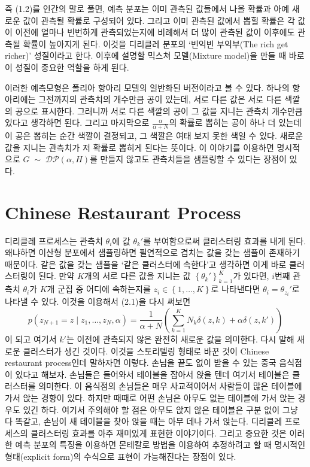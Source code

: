 \documentclass[a4paper, 10pt]{book}
\begin{document}
  즉 (1.2)를 인간의 말로 풀면, 예측 분포는 이미 관측된 값들에서 나올 확률과 아예 새로운 값이 관측될 확률로 구성되어 있다. 그리고 이미 관측된 값에서 뽑힐 확률은 각 값이 이전에 얼마나 빈번하게 관측되었는지에 비례해서 더 많이 관측된 값이 이후에도 관측될 확률이 높아지게 된다. 이것을 디리클레 분포의 `빈익빈 부익부(The rich get richer)' 성질이라고 한다. 이후에 설명할 믹스쳐 모델(Mixture model)을 만들 때 바로 이 성질이 중요한 역할을 하게 된다. \par
  이러한 예측모형은 폴리아 항아리 모델의 일반화된 버전이라고 볼 수 있다. 하나의 항아리에는 그전까지의 관측치의 개수만큼 공이 있는데, 서로 다른 값은 서로 다른 색깔의 공으로 표시한다. 그러니까 서로 다른 색깔의 공이 그 값을 지니는 관측치 개수만큼 있다고 생각하면 된다. 그리고 마지막으로 $\frac{\alpha}{\alpha+N}$의 확률로 뽑히는 공이 하나 더 있는데 이 공은 뽑히는 순간 색깔이 결정되고, 그 색깔은 여태 보지 못한 색일 수 있다. 새로운 값을 지니는 관측치가 저 확률로 뽑히게 된다는 뜻이다. 이 이야기를 이용하면 명시적으로 $G\;\sim\;\mathcal{DP}\left(\alpha, H\right)$를 만들지 않고도 관측치들을 샘플링할 수 있다는 장점이 있다.
  \section{Chinese Restaurant Process}
    디리클레 프로세스는 관측치 $\theta_{i}$에 값 $\theta_{k}'$를 부여함으로써 클러스터링 효과를 내게 된다. 왜냐하면 이산형 분포에서 샘플링하면 필연적으로 겹치는 값을 갖는 샘플이 존재하기 때문이다. 같은 값을 갖는 샘플을 `같은 클러스터에 속한다'고 생각하면 이게 바로 클러스터링이 된다. 만약 $K$개의 서로 다른 값을 지니는 값 $\left\{\theta_{k}'\right\}_{k=1}^{K}$가 있다면, $i$번째 관측치 $\theta_{i}$가 $K$개 군집 중 어디에 속하는지를 $z_{i}\in\left\{1,\ldots , K\right\}$로 나타낸다면 $\theta_{i}=\theta_{z_{i}}'$로 나타낼 수 있다. 이것을 이용해서 (2.1)을 다시 써보면
    \begin{equation}
    p\left(z_{N+1}=z\;|\;z_{1}, \ldots , z_{N},\alpha\right) = \frac{1}{\alpha+N}\left(\sum_{k=1}^{K}N_{k}\delta\left(z,k\right)+\alpha\delta\left(z,k'\right)\right)
    \end{equation}
    이 되고 여기서 $k'$는 이전에 관측되지 않은 완전히 새로운 값을 의미한다. 다시 말해 새로운 클러스터가 생긴 것이다. 이것을 스토리텔링 형태로 바꾼 것이 Chinese restaurant process인데 말하자면 이렇다. 손님을 끝도 없이 받을 수 있는 중국 음식점이 있다고 해보자. 손님들은 들어와서 테이블을 잡아서 앉을 텐데 여기서 테이블은 클러스터를 의미한다. 이 음식점의 손님들은 매우 사교적이어서 사람들이 많은 테이블에 가서 앉는 경향이 있다. 하지만 때때로 어떤 손님은 아무도 없는 테이블에 가서 앉는 경우도 있긴 하다. 여기서 주의해야 할 점은 아무도 앉지 않은 테이블은 구분 없이 그냥 다 똑같고, 손님이 새 테이블을 찾아 앉을 때는 아무 데나 가서 앉는다. 디리클레 프로세스의 클러스터링 효과를 아주 재미있게 표현한 이야기이다. 그리고 중요한 것은 이러한 예측 분포의 특징을 이용하면 몬테칼로 방법을 이용하여 추정하려고 할 때 명시적인 형태(explicit form)의 수식으로 표현이 가능해진다는 장점이 있다.
\end{document}
